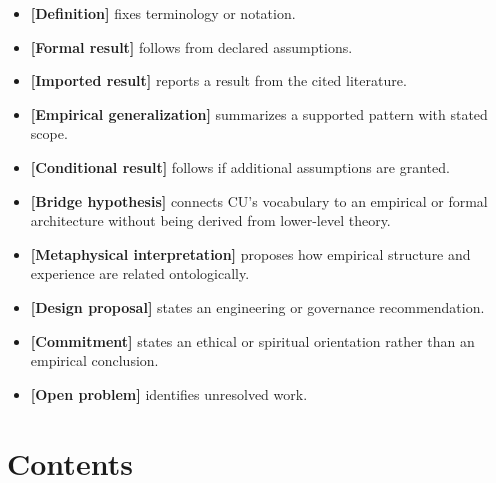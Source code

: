 \documentclass[
  11pt,
]{article}
\providecommand{\tightlist}{%
  \setlength{\itemsep}{0pt}\setlength{\parskip}{0pt}}
\begin{document}
\begin{itemize}
\tightlist
\item
  \textbf{{[}Definition{]}} fixes terminology or notation.
\item
  \textbf{{[}Formal result{]}} follows from declared assumptions.
\item
  \textbf{{[}Imported result{]}} reports a result from the cited
  literature.
\item
  \textbf{{[}Empirical generalization{]}} summarizes a supported pattern
  with stated scope.
\item
  \textbf{{[}Conditional result{]}} follows if additional assumptions
  are granted.
\item
  \textbf{{[}Bridge hypothesis{]}} connects CU's vocabulary to an
  empirical or formal architecture without being derived from
  lower-level theory.
\item
  \textbf{{[}Metaphysical interpretation{]}} proposes how empirical
  structure and experience are related ontologically.
\item
  \textbf{{[}Design proposal{]}} states an engineering or governance
  recommendation.
\item
  \textbf{{[}Commitment{]}} states an ethical or spiritual orientation
  rather than an empirical conclusion.
\item
  \textbf{{[}Open problem{]}} identifies unresolved work.
\end{itemize}

\section{Contents}\label{contents}
\end{document}
